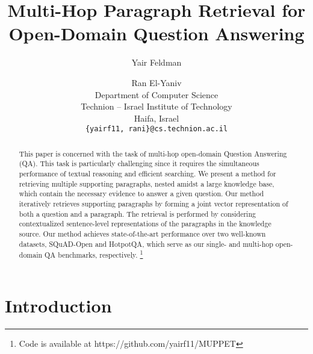 \documentclass[11pt,a4paper,dvipsnames]{article}
\title{Multi-Hop Paragraph Retrieval for Open-Domain Question Answering}
\author{Yair Feldman \and Ran El-Yaniv\\
  Department of Computer Science \\
  Technion – Israel Institute of Technology \\
  Haifa, Israel \\
  \texttt{\{yairf11, rani\}@cs.technion.ac.il}}
\date{}
\begin{document}
\maketitle
\begin{abstract}
  This paper is concerned with the task of multi-hop open-domain Question Answering (QA). This task is particularly challenging since it requires the simultaneous performance of textual reasoning and efficient searching. We present a method for retrieving multiple supporting paragraphs, nested amidst a large knowledge base, which contain the necessary evidence to answer a given question. Our method iteratively retrieves supporting paragraphs by forming a joint vector representation of both a question and a paragraph. The retrieval is performed by considering contextualized sentence-level representations of the paragraphs in the knowledge source. Our method achieves state-of-the-art performance over two well-known datasets, SQuAD-Open and HotpotQA, which serve as our single- and multi-hop open-domain QA benchmarks, respectively.
  \footnote{Code is available at https://github.com/yairf11/MUPPET}
\end{abstract}

\section{Introduction}
\end{document}
